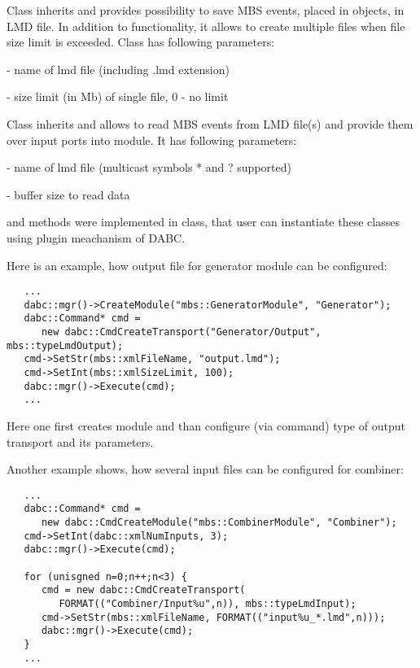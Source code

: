 Class  inherits  and provides possibility to save 
MBS events, placed in  objects, in LMD file. 
In addition to  functionality, it allows to create
multiple files when file size limit is exceeded. Class has following parameters:
\bbul
\item {}      - name of lmd file (including .lmd extension)  
\item {} - size limit (in Mb) of single file, 0 - no limit
\ebul

Class  inherits  and allows to read 
MBS events from LMD file(s) and provide them over input ports into module. 
It has following parameters:
\bbul
\item {} - name of lmd file (multicast symbols * and ? supported)  
\item {}  - buffer size to read data
\ebul

 and  methods were implemented in  class, 
that user can instantiate these classes using plugin meachanism of DABC. 
  

Here is an example, how output file for generator module can be configured:
   
\begin{verbatim}
   ...
   dabc::mgr()->CreateModule("mbs::GeneratorModule", "Generator");
   dabc::Command* cmd = 
      new dabc::CmdCreateTransport("Generator/Output", mbs::typeLmdOutput);
   cmd->SetStr(mbs::xmlFileName, "output.lmd");
   cmd->SetInt(mbs::xmlSizeLimit, 100);
   dabc::mgr()->Execute(cmd);
   ...
\end{verbatim}
       
Here one first creates module and than configure (via command) type of
output transport and its parameters.        
       
Another example shows, how several input files can be configured for combiner:
   
\begin{verbatim}
   ...
   dabc::Command* cmd = 
      new dabc::CmdCreateModule("mbs::CombinerModule", "Combiner");
   cmd->SetInt(dabc::xmlNumInputs, 3);
   dabc::mgr()->Execute(cmd);
   
   for (unisgned n=0;n++;n<3) {
      cmd = new dabc::CmdCreateTransport(
         FORMAT(("Combiner/Input%u",n)), mbs::typeLmdInput);
      cmd->SetStr(mbs::xmlFileName, FORMAT(("input%u_*.lmd",n)));
      dabc::mgr()->Execute(cmd);
   }   
   ...
\end{verbatim}

